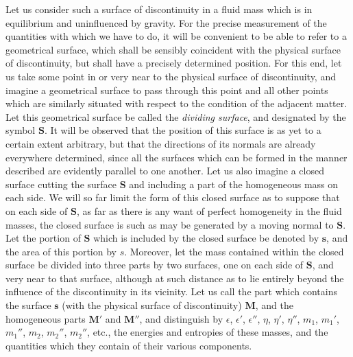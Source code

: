 \documentclass[12pt]{article}
\begin{document}
{Let us consider such a surface of discontinuity in a fluid mass which is in equilibrium and uninfluenced by gravity. For the precise measurement of the quantities with which we have to do, it will be convenient to be able to refer to a geometrical surface, which shall be sensibly coincident with the physical surface of discontinuity, but shall have a precisely determined position. For this end, let us take some point in or very near to the physical surface of discontinuity, and imagine a geometrical surface to pass through this point and all other points which are similarly situated with respect to the condition of the adjacent matter. Let this geometrical surface be called the \textit{dividing surface}, and designated by the symbol $\mathbf{S}$.  It will be observed that the position of this surface is as yet to a certain extent arbitrary, but that the directions of its normals are already everywhere determined, since all the surfaces which can be formed in the manner described are evidently parallel to one another. Let us also imagine a closed surface cutting the surface $\mathbf{S}$ and including a part of the homogeneous mass on each side. We will so far limit the form of this closed surface as to suppose that on each side of $\mathbf{S}$, as far as there is any want of perfect homogeneity in the fluid masses, the closed surface is such as may be generated by a moving normal to $\mathbf{S}$.
Let the portion of $\mathbf{S}$ which is included by the closed surface be denoted by $\mathbf{s}$, and the area of this portion by $s$.  Moreover, let the mass contained within the closed surface be divided into three parts by two surfaces, one on each side of $\mathbf{S}$, and very near to that surface, although at such distance as to lie entirely beyond the influence of the discontinuity in its vicinity. Let us call the part which contains the surface $\mathbf{s}$ (with the physical surface of discontinuity) $\mathbf{M}$, and the homogeneous parts $\mathbf{M}'$ and $\mathbf{M}''$, and distinguish by $\epsilon$, $\epsilon'$, $\epsilon''$, $\eta$, $\eta'$, $\eta''$, $m_1$, $m_1'$, $m_1''$, $m_2$, $m_2''$, $m_2''$, etc., the energies and entropies of these masses, and the quantities which they contain of their various components.


}
\end{document}
